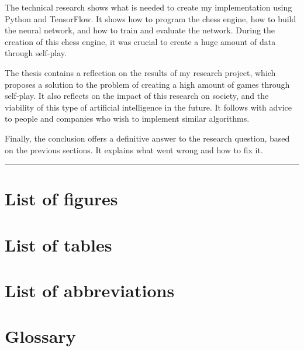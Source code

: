 \documentclass{article}
\makeatletter
\renewcommand\tableofcontents{%
  \null\hfill\textbf{\Huge\contentsname}\hfill\null\par
  \vline\noexpand\rule{\textwidth}{1pt}%
  \@mkboth{\MakeUppercase\contentsname}{\MakeUppercase\contentsname}%
  \@starttoc{toc}%
}
\makeatother
\begin{document}
The technical research shows what is needed to create my implementation using Python and TensorFlow. 
It shows how to program the chess engine, how to build the neural network, and how to train and evaluate the network.
During the creation of this chess engine, it was crucial to create a huge amount of data through self-play.


The thesis contains a reflection on the results of my research project, which proposes a solution to the problem of
creating a high amount of games through self-play. It also reflects on the impact of this research on society, and the
viability of this type of artificial intelligence in the future. It follows with advice to people and companies who wish to implement similar algorithms. 

Finally, the conclusion offers a definitive answer to the research question, based on the previous sections.
It explains what went wrong and how to fix it. 

\newpage
\thispagestyle{empty}
\mbox{}
\newpage

\tableofcontents
\newpage

\section*{List of figures}
\renewcommand{\listfigurename}{}
\listoffigures

\section*{List of tables}
\renewcommand{\listtablename}{}
\listoftables

\newpage
\section*{List of abbreviations}


\newpage
\section*{Glossary}
\end{document}
